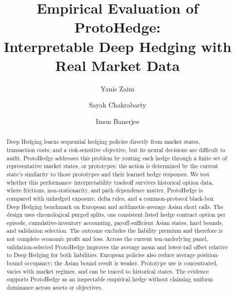 \documentclass[sigconf]{acmart}
\begin{document}
\title[Empirical Evaluation of ProtoHedge]{Empirical Evaluation of
ProtoHedge:\\Interpretable Deep Hedging with Real Market Data}


\author{Yanis Zaim}

\author{Sayak Chakrabarty}

\author{Imon Banerjee}
\renewcommand{\shortauthors}{Zaim, Chakrabarty, and Banerjee}

\begin{abstract}
Deep Hedging learns sequential hedging policies directly from market states,
transaction costs, and a risk-sensitive objective, but its neural decisions
are difficult to audit. ProtoHedge addresses this problem by routing each
hedge through a finite set of representative market states, or prototypes:
the action is determined by the current state's similarity to those
prototypes and their learned hedge responses. We test whether this
performance--interpretability tradeoff survives historical option data, where
frictions, non-stationarity, and path dependence matter. ProtoHedge is compared
with unhedged exposure, delta rules, and a common-protocol black-box Deep
Hedging benchmark on European and arithmetic-average Asian short calls. The
design uses chronological purged splits, one consistent listed hedge contract
option per episode, cumulative-inventory accounting, payoff-sufficient Asian
states, hard bounds, and validation selection. The outcome excludes the
liability premium and therefore is not complete economic profit and loss.
Across the current ten-underlying panel, validation-selected ProtoHedge
improves the average mean and lower-tail offset relative to Deep Hedging for
both liabilities. European policies also reduce average position-bound
occupancy; the Asian bound result is weaker. Prototype use is concentrated,
varies with market regimes, and can be traced to historical states. The
evidence supports ProtoHedge as an inspectable empirical hedge without claiming
uniform dominance across assets or objectives.
\end{abstract}
\end{document}
